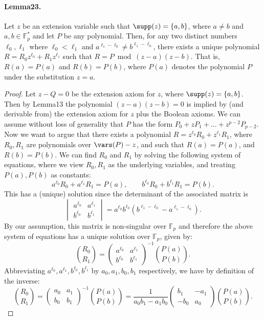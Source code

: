\paragraph{Lemma23.} Let $z$ be an extension variable such that $\supp(z)=\{a,b\}$, where $a\neq b$ and $a,b\in\mathbb F_p^*$ and let $P$ be any polynomial. Then, for any two distinct numbers $\ell_0,\ell_1$ where $\ell_0<\ell_1$ and $a^{\ell_1-\ell_0}\neq b^{\ell_1-\ell_0}$, there exists a unique polynomial $R=R_0z^{\ell_0}+R_1z^{\ell_1}$ such that $R=P\bmod(z-a)(z-b)$. That is, $R(a)=P(a)$ and $R(b)=P(b)$, where $P(a)$ denotes the polynomial $P$ under the substitution $z=a$.
\begin{proof}
Let $z-Q=0$ be the extension axiom for $z$, where $\supp(z)=\{a,b\}$. Then by Lemma13 the polynomial $(z-a)(z-b)=0$ is implied by (and derivable from) the extension axiom for $z$ plus the Boolean axioms. We can assume without loss of generality that $P$ has the form $P_0+zP_1+\ldots+z^{p-2}P_{p-2}$.
Now we want to argue that there exists a polynomial $R=z^{\ell_0}R_0+z^{\ell_1}R_1$, where $R_0,R_1$ are polynomials over $\vars(P)-z$, and such that $R(a)=P(a)$, and $R(b)=P(b)$. We can find $R_0$ and $R_1$ by solving the following system of equations, where we view $R_0,R_1$ as the underlying variables, and treating $P(a),P(b)$ as constants:
\[a^{\ell_0}R_0+a^{\ell_1}R_1=P(a),\qquad b^{\ell_0}R_0+b^{\ell_1}R_1=P(b).\]
This has a (unique) solution since the determinant of the associated matrix is
\[\begin{vmatrix}a^{\ell_0}&a^{\ell_1}\\b^{\ell_0}&b^{\ell_1}\end{vmatrix}=a^{\ell_0}b^{\ell_0}(b^{\ell_1-\ell_0}-a^{\ell_1-\ell_0}).\]
By our assumption, this matrix is non-singular over $\mathbb F_p$ and therefore the above system of equations has a unique solution over $\mathbb F_p$, given by:
\[\binom{R_0}{R_1}=\begin{pmatrix}a^{\ell_0}&a^{\ell_1}\\b^{\ell_0}&b^{\ell_1}\end{pmatrix}^{-1}\binom{P(a)}{P(b)}.\]
Abbreviating $a^{\ell_0},a^{\ell_1},b^{\ell_0},b^{\ell_1}$ by $a_0,a_1,b_0,b_1$ respectively, we have by definition of the inverse:
\[\binom{R_0}{R_1}=\begin{pmatrix}a_0&a_1\\b_0&b_1\end{pmatrix}^{-1}\binom{P(a)}{P(b)}=\frac{1}{a_0b_1-a_1b_0}\begin{pmatrix}b_1&-a_1\\-b_0&a_0\end{pmatrix}\binom{P(a)}{P(b)}.\]

\end{proof}
